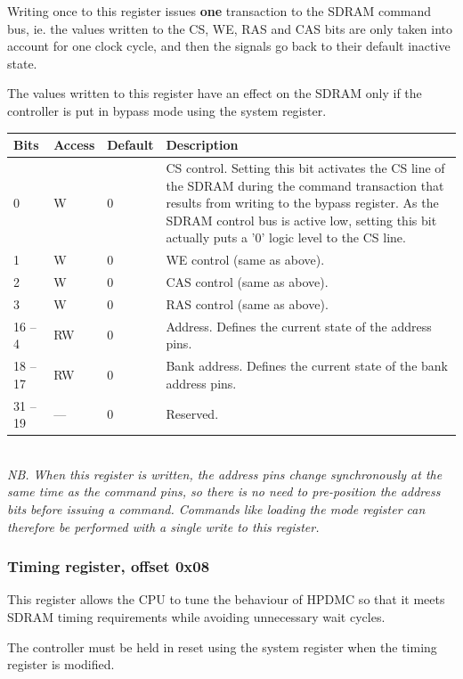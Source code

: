 \documentclass[a4paper,11pt]{article}
\begin{document}
Writing once to this register issues \textbf{one} transaction to the SDRAM command bus, ie. the values written to the CS, WE, RAS and CAS bits are only taken into account for one clock cycle, and then the signals go back to their default inactive state.

The values written to this register have an effect on the SDRAM only if the controller is put in bypass mode using the system register.\\

\begin{tabular}{|p{1.5cm}|l|l|p{10cm}|}
\hline
\bf Bits & \bf Access & \bf Default & \bf Description \\
\hline
0 & W & 0 & CS control. Setting this bit activates the CS line of the SDRAM during the command transaction that results from writing to the bypass register. As the SDRAM control bus is active low, setting this bit actually puts a '0' logic level to the CS line. \\
\hline
1 & W & 0 & WE control (same as above). \\
\hline
2 & W & 0 & CAS control (same as above). \\
\hline
3 & W & 0 & RAS control (same as above). \\
\hline
16 -- 4 & RW & 0 & Address. Defines the current state of the address pins. \\
\hline
18 -- 17 & RW & 0 & Bank address. Defines the current state of the bank address pins. \\
\hline
31 -- 19 & --- & 0 & Reserved. \\
\hline
\end{tabular}\\

\textit{NB. When this register is written, the address pins change synchronously at the same time as the command pins, so there is no need to pre-position the address bits before issuing a command. Commands like loading the mode register can therefore be performed with a single write to this register.}

\subsubsection{Timing register, offset 0x08}
This register allows the CPU to tune the behaviour of HPDMC so that it meets SDRAM timing requirements while avoiding unnecessary wait cycles.

The controller must be held in reset using the system register when the timing register is modified.\\
\end{document}
